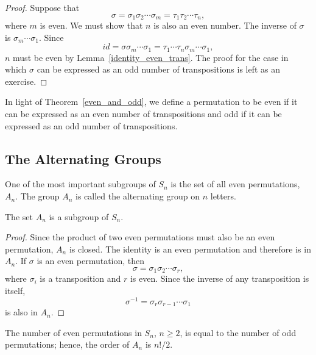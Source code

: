 \begin{proof}
Suppose that
\[
\sigma = \sigma_1 \sigma_2 \cdots \sigma_m = \tau_1 \tau_2 \cdots
\tau_n, 
\]
where $m$ is even. We must show that $n$ is also an even number.  The
inverse of $\sigma$ is $\sigma_m \cdots \sigma_1$. Since 
\[
id = \sigma \sigma_m \cdots \sigma_1
= \tau_1  \cdots \tau_n \sigma_m \cdots \sigma_1,
\]
$n$ must be even by Lemma~\ref{identity_even_trans}.  The proof for the case in which
$\sigma$ can be expressed as an odd number of transpositions is left
as an exercise.  
\end{proof}

 
\medskip
 
In light of Theorem~\ref{even_and_odd}, we define a permutation to be {\bfi
even} if  
it can be expressed as an even number of transpositions and {\bfi
odd}  
if it can be expressed as an odd number of transpositions.
 
 
\subsection*{The Alternating Groups}

One of the most important subgroups of $S_n$ is the set of
all even permutations, $A_n$\label{alternatinggroup}.  The group $A_n$ is called the {\bfi
alternating group on $n$ letters}. 
 
 
\begin{theorem}
The set $A_n$ is a subgroup of $S_n$.
\end{theorem}
 
 
\begin{proof}
Since the product of two even permutations must also be an even
permutation, $A_n$ is closed.  The identity is an even permutation and
therefore is in $A_n$. If $\sigma$ is an even permutation, then
\[
\sigma = \sigma_1 \sigma_2 \cdots \sigma_r,
\]
where $\sigma_i$ is a transposition and $r$ is even. Since the inverse
of any transposition is itself, 
\[
\sigma^{-1} = \sigma_r \sigma_{r-1} \cdots \sigma_1
\]
is also in $A_n$.
\end{proof}
 
 
\begin{proposition}
The number of even permutations in $S_n$, $n \geq 2$, is equal to the
number of odd permutations; hence, the order of $A_n$ is $n!/2$.
\end{proposition}
 
